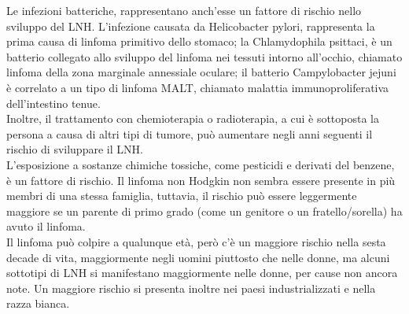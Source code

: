 Le infezioni batteriche, rappresentano anch’esse un fattore di rischio nello sviluppo del LNH. 
L’infezione causata da Helicobacter pylori, rappresenta la prima causa di linfoma primitivo dello stomaco; 
la Chlamydophila psittaci, è un batterio collegato allo sviluppo del linfoma nei tessuti intorno all’occhio, 
chiamato linfoma della zona marginale annessiale oculare; il batterio Campylobacter jejuni è correlato a un tipo 
di linfoma MALT, chiamato malattia immunoproliferativa dell'intestino tenue\cite{AMERICANCS}.\\
Inoltre, il trattamento con chemioterapia o radioterapia, a cui è sottoposta la persona a causa di altri tipi di tumore, 
può aumentare negli anni seguenti  il rischio di sviluppare il LNH\cite{AMERICANCS}.\\

L’esposizione a sostanze chimiche tossiche, come pesticidi e derivati del benzene, è un fattore di rischio. 
Il linfoma non Hodgkin non sembra essere presente in più membri di una stessa famiglia, tuttavia, 
il rischio può essere leggermente maggiore se un parente di primo grado (come un genitore o un fratello/sorella) 
ha avuto il linfoma\cite{AMERICANCS}.\\
Il linfoma può colpire a qualunque età, però c’è un maggiore rischio nella sesta decade di vita, 
maggiormente negli uomini piuttosto che nelle donne, ma alcuni sottotipi di LNH si manifestano 
maggiormente nelle donne, per cause non ancora note. 
Un maggiore rischio si presenta inoltre nei paesi industrializzati e nella razza bianca\cite{AMERICANCS}.\\ 

